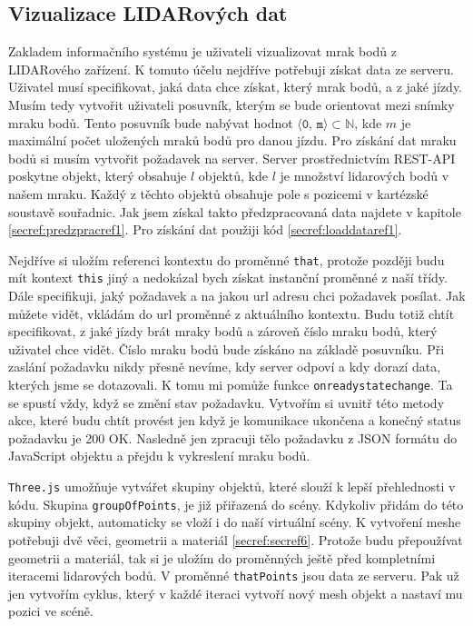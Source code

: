 \documentclass[czech,bachelor,dept420,male,cpdeclaration]{diploma}
\begin{document}
\subsection{Vizualizace LIDARových dat}  
Zakladem informačního systému je uživateli vizualizovat mrak bodů z LIDARového zařízení. K tomuto účelu nejdříve potřebuji získat data ze serveru. Uživatel musí specifikovat, jaká data chce získat, který mrak bodů, a z jaké jízdy. Musím tedy vytvořit uživateli posuvník, kterým se bude orientovat mezi snímky mraku bodů. Tento posuvník bude nabývat hodnot 
$\langle \texttt{0, m}\rangle \subset \mathbb{N}$, kde $m$ je maximální počet uložených mraků bodů pro danou jízdu. Pro získání dat mraku bodů si musím vytvořit požadavek na server. Server prostřednictvím REST-API poskytne objekt, který obsahuje $l$ objektů, kde $l$ je množství lidarových bodů v našem mraku. Každý z těchto objektů obsahuje pole s pozicemi v kartézské soustavě souřadnic. Jak jsem získal takto předzpracovaná data najdete v kapitole \ref{secref:predzpracref1}. Pro získání dat použiji kód \ref{secref:loaddataref1}.



Nejdříve si uložím referenci kontextu do proměnné \texttt{that}, protože později budu mít kontext \texttt{this} jiný a nedokázal bych získat instanční proměnné z naší třídy. Dále specifikuji, jaký požadavek a na jakou url adresu chci požadavek posílat. Jak můžete vidět, vkládám do url proměnné z aktuálního kontextu. Budu totiž chtít specifikovat, z jaké jízdy brát mraky bodů a zároveň číslo mraku bodů, který uživatel chce vidět. Číslo mraku bodů bude získáno na základě posuvníku. Při zaslání požadavku nikdy přesně nevíme, kdy server odpoví a kdy dorazí data, kterých jsme se dotazovali. K tomu mi pomůže funkce \texttt{onreadystatechange}. Ta se spustí vždy, když se změní stav požadavku. Vytvořím si uvnitř této metody akce, které budu chtít provést jen když je komunikace ukončena a konečný status požadavku je 200 OK. Nasledně jen zpracuji tělo požadavku z JSON formátu do JavaScript objektu a přejdu k vykreslení mraku bodů.




\texttt{Three.js} umožňuje vytvářet skupiny objektů, které slouží k lepší přehlednosti v kódu. Skupina \texttt{groupOfPoints}, je již přiřazená do scény. Kdykoliv přidám do této skupiny objekt, automaticky se vloží i do naší virtuální scény. K vytvoření meshe potřebuji dvě věci, geometrii a materiál \ref{secref:secref6}. Protože budu přepoužívat geometrii a materiál, tak si je uložím do proměnných ještě před kompletními iteracemi lidarových bodů. V proměnné \texttt{thatPoints} jsou data ze serveru. Pak už jen vytvořím cyklus, který v každé iteraci vytvoří nový mesh objekt a nastaví mu pozici ve scéně.
\end{document}
